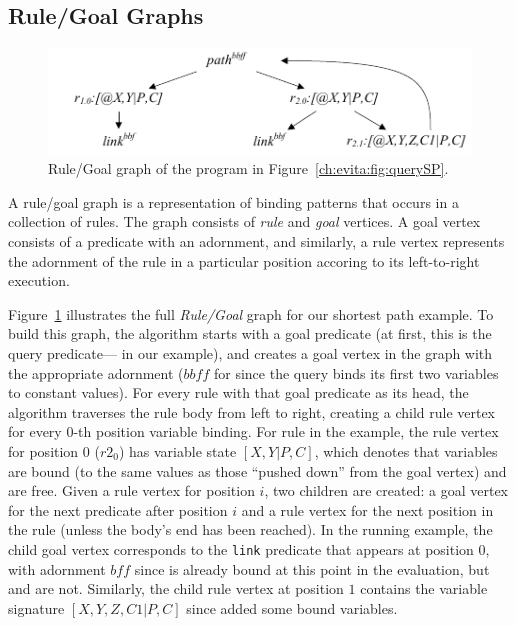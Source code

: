 \subsection{Rule/Goal Graphs}

\begin{figure}[!t]
\begin{center}
\includegraphics[scale=1.8]{figures/RuleGoalGraph}
\caption{Rule/Goal graph of the program in Figure~\ref{ch:evita:fig:querySP}.}
\label{ch:evita:fig:rggraph}
\end{center}
\end{figure}

A rule/goal graph is a representation of binding patterns that occurs in a
collection of rules.  The graph consists of \emph{rule} and \emph{goal}
vertices.  A goal vertex consists of a predicate with an adornment, and
similarly, a rule vertex represents the adornment of the rule in a particular
position accoring to its left-to-right execution.

Figure~\ref{ch:evita:fig:rggraph} illustrates the full {\em Rule/Goal} graph
for our shortest path example.  To build this graph, the algorithm starts with
a goal predicate (at first, this is the query predicate--- in our
example), and creates a goal vertex in the graph with the appropriate adornment
($\mathit{bbff}$ for  since the query binds its first two variables to
constant values).  For every rule with that goal predicate as its head, the
algorithm traverses the rule body from left to right, creating a child rule
vertex for every $0$-th position variable binding.  For rule  in the
example, the rule vertex for position $0$ ($r2_0$) has variable state
$[X,Y|P,C]$, which denotes that variables  are bound (to the same
values as those ``pushed down'' from the goal vertex) and  are free.
Given a rule vertex for position $i$, two children are created: a goal vertex
for the next predicate after position $i$ and a rule vertex for the next
position in the rule (unless the body's end has been reached).  In the running
example, the child goal vertex corresponds to the {\tt link} predicate that
appears at position $0$, with adornment $\mathit{bff}$ since  is already
bound at this point in the evaluation, but  and  are not.
Similarly, the child rule vertex at position $1$ contains the variable
signature $[X,Y,Z,C1|P,C]$ since  added some bound variables.  

